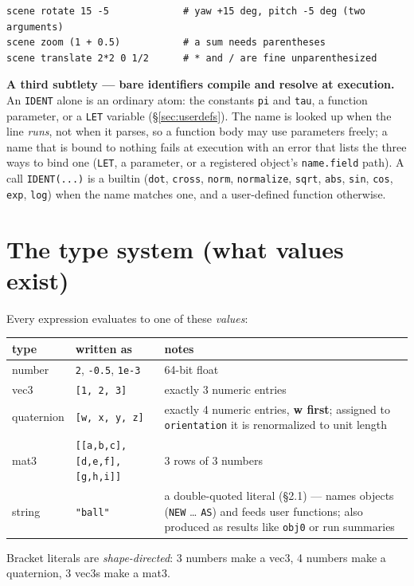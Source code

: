\documentclass[11pt]{article}
\newcommand{\kw}[1]{\texttt{\uppercase{#1}}}
\newcommand{\code}[1]{\texttt{#1}}
\begin{document}
\begin{lstlisting}
scene rotate 15 -5             # yaw +15 deg, pitch -5 deg (two arguments)
scene zoom (1 + 0.5)           # a sum needs parentheses
scene translate 2*2 0 1/2      # * and / are fine unparenthesized
\end{lstlisting}

\textbf{A third subtlety --- bare identifiers compile and resolve at
execution.} An \code{IDENT} alone is an ordinary atom: the constants
\code{pi} and \code{tau}, a function parameter, or a \kw{let}
variable (\S\ref{sec:userdefs}). The name is looked up when the line
\emph{runs}, not when it parses, so a function body may use
parameters freely; a name that is bound to nothing fails at execution
with an error that lists the three ways to bind one (\kw{let}, a
parameter, or a registered object's \code{name.field} path). A call
\code{IDENT(...)} is a builtin (\code{dot}, \code{cross},
\code{norm}, \code{normalize}, \code{sqrt}, \code{abs}, \code{sin},
\code{cos}, \code{exp}, \code{log}) when the name matches one, and a
user-defined function otherwise.

\section{The type system (what values exist)}

Every expression evaluates to one of these \emph{values}:

\begin{center}
\begin{tabular}{llp{7.2cm}}
\textbf{type} & \textbf{written as} & \textbf{notes}\\\hline
number & \code{2}, \code{-0.5}, \code{1e-3} & 64-bit float\\
vec3 & \code{[1, 2, 3]} & exactly 3 numeric entries\\
quaternion & \code{[w, x, y, z]} & exactly 4 numeric entries, \textbf{w first}; assigned to \code{orientation} it is renormalized to unit length\\
mat3 & \code{[[a,b,c],[d,e,f],[g,h,i]]} & 3 rows of 3 numbers\\
string & \code{"ball"} & a double-quoted literal (\S2.1) --- names objects (\kw{new} \ldots{} \kw{as}) and feeds user functions; also produced as results like \code{obj0} or run summaries\\
\end{tabular}
\end{center}

Bracket literals are \emph{shape-directed}: 3 numbers make a vec3,
4 numbers make a quaternion, 3 vec3s make a mat3.
\end{document}
